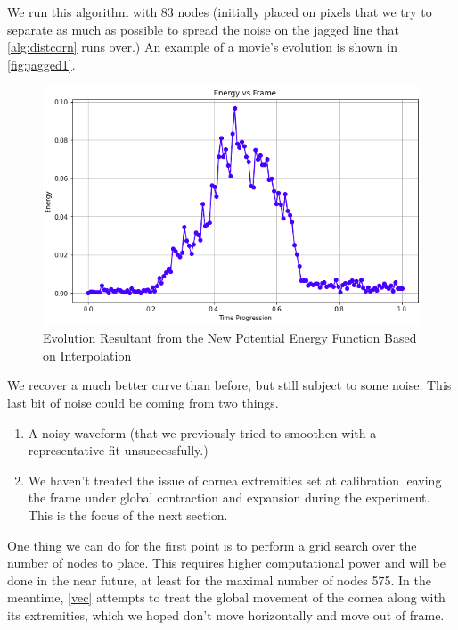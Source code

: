 \documentclass[epjST]{svjour}
\begin{document}
\noindent
We run this algorithm with 83 nodes (initially placed on pixels that we try to separate as much as possible to spread the noise on the jagged line that \autoref{alg:distcorn} runs over.) An example of a movie's evolution is shown in \autoref{fig:jagged1}.
\begin{figure}[h]
    \centering
    \includegraphics[width=0.8\linewidth]{figures/minimization2/jagged1.png}
    \caption{Evolution Resultant from the New Potential Energy Function Based on Interpolation}
    \label{fig:jagged1}
\end{figure}
We recover a much better curve than before, but still subject to some noise. This last bit of noise could be coming from two things.
\begin{enumerate}
    \item A noisy waveform (that we previously tried to smoothen with a representative fit unsuccessfully.)
    \\
    \item We haven't treated the issue of cornea extremities set at calibration leaving the frame under global contraction and expansion during the experiment. This is the focus of the next section.
\end{enumerate}
One thing we can do for the first point is to perform a grid search over the number of nodes to place. This requires higher computational power and will be done in the near future, at least for the maximal number of nodes 575. In the meantime, \autoref{vec} attempts to treat the global movement of the cornea along with its extremities, which we hoped don't move horizontally and move out of frame.
\end{document}
